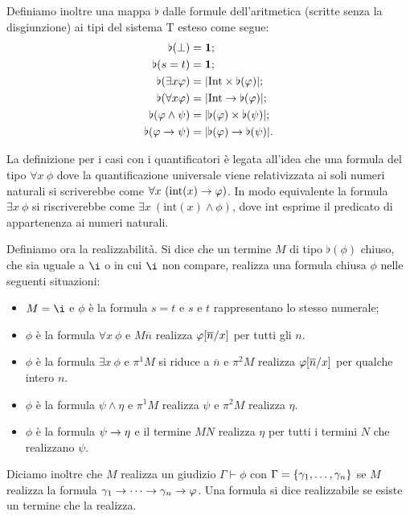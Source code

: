 \documentclass[]{marticle}
\begin{document}
Definiamo inoltre una mappa $\flat$ dalle formule dell'aritmetica (scritte senza
la disgiunzione) ai tipi del sistema T esteso come segue:
\begin{align*}
    \flat(\bot) &=\text{\textbf{1}};\\
    \flat(s=t) &= \text{\textbf{1}};\\
    \flat(\exists x \varphi) &= |\text{Int} \times \flat(\varphi)|;\\
    \flat(\forall x \varphi) &= |\text{Int} \rightarrow \flat(\varphi)|;\\
    \flat(\varphi \land \psi) &= |\flat(\varphi) \times \flat(\psi)|;\\
    \flat(\varphi \rightarrow \psi) &= |\flat(\varphi) \rightarrow \flat(\psi)|.\\
\end{align*}

La definizione per i casi con i quantificatori \`e legata all'idea che una
formula del tipo $\forall x\ \phi$ dove la quantificazione universale viene
relativizzata ai soli numeri naturali si scriverebbe come $\forall x\
(\text{int}(x) \rightarrow \varphi)$. In modo equivalente la formula $\exists x\ \phi$ si
riscriverebbe come $\exists x\ (\text{int}(x) \land \phi)$, dove $\text{int}$
esprime il predicato di appartenenza ai numeri naturali.

Definiamo ora la realizzabilit\`a. Si dice che un termine $M$ di tipo
$\flat(\phi)$ chiuso, che sia uguale a $\i$ o in cui $\i$ non compare, realizza
una formula chiusa $\phi$ nelle seguenti situazioni:
\begin{itemize}
    \item $M=\i$ e $\phi$ \`e la formula $s=t$ e $s$ e $t$ rappresentano lo
        stesso numerale;
    \item $\phi$ \`e la formula $\forall x\ \phi$ e $M\overline{n}$ realizza
        $\varphi[\overline{n}/x]$ per tutti gli $n$.
    \item $\phi$ \`e la formula $\exists x\ \phi$ e $\pi^1M$ si riduce a
        $\overline{n}$ e $\pi^2M$ realizza $\varphi[\overline{n}/x]$ per
        qualche intero $n$.
    \item $\phi$ \`e la formula $\psi\land\eta$ e $\pi^1M$ realizza $\psi$ e
        $\pi^2M$ realizza $\eta$.
    \item $\phi$ \`e la formula $\psi \rightarrow \eta$ e il termine $MN$ realizza
        $\eta$ per tutti i termini $N$ che realizzano $\psi$.
\end{itemize}

Diciamo inoltre che $M$ realizza un giudizio $\Gamma \vdash\phi$ con
$\Gamma=\{\gamma_1,\dots,\gamma_n\}$ se $M$ realizza la formula
$\gamma_1\rightarrow\cdots\rightarrow\gamma_n\rightarrow \varphi$. Una formula si dice realizzabile se
esiste un termine che la realizza.
\end{document}
